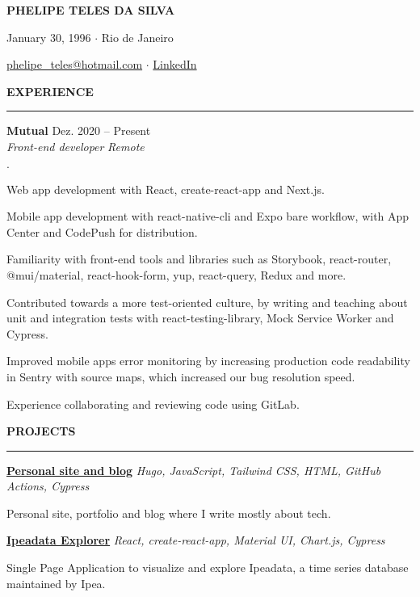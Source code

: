 \documentclass[12pt,letterpaper]{article}
\newenvironment{tightlist}
  {\begin{list}
    {$\cdot$}
    {
      \setlength{\leftmargin}{0em}
      \setlength{\itemsep}{-\smallskipamount}
    }
  }
{\end{list}}
\begin{document}
\pagestyle{empty}

\centerline{\huge\bf PHELIPE TELES DA SILVA}
\medskip

\centerline{January 30, 1996 $\cdot$ Rio de Janeiro}
\smallskip

\centerline{
  \href{mailto:phelipe_teles@hotmail.com}{phelipe\_teles@hotmail.com}
  $\cdot$
  \href{https://linkedin.com/in/phelipeteles}{LinkedIn}
}
\smallskip

\medskip \textbf{EXPERIENCE} \medskip
\hrule

\textbf{Mutual} \hfill Dez. 2020 -- Present \\
\emph{Front-end developer} \hfill \emph{Remote} {\parfillskip=0pt\par}

\begin{tightlist}
  \item Web app development with React, create-react-app and Next.js.
  \item Mobile app development with react-native-cli and Expo bare workflow,
    with App Center and CodePush for distribution.
  \item Familiarity with front-end tools and libraries such as Storybook,
    react-router, @mui/material, react-hook-form, yup, react-query, Redux and
    more.
  \item Contributed towards a more test-oriented culture, by writing and
    teaching about unit and integration tests with react-testing-library,
    Mock Service Worker and Cypress.
  \item Improved mobile apps error monitoring by increasing production code readability in
    Sentry with source maps, which increased our bug resolution speed.
  \item Experience collaborating and reviewing code using GitLab.
\end{tightlist}

\medskip \textbf{PROJECTS} \medskip
\hrule

\textbf{\href{https://phelipetls.github.io}{Personal site and blog}} \hfill \emph{Hugo, JavaScript, Tailwind CSS, HTML, GitHub Actions, Cypress}
{\parfillskip=0pt\par}
Personal site, portfolio and blog where I write mostly about tech.

\smallskip

\textbf{\href{http://ipeadata-explorer.surge.sh}{Ipeadata Explorer}} \hfill \emph{React, create-react-app, Material UI, Chart.js, Cypress}
{\parfillskip=0pt\par}
Single Page Application to visualize and explore Ipeadata, a time series database maintained by Ipea.
\end{document}
